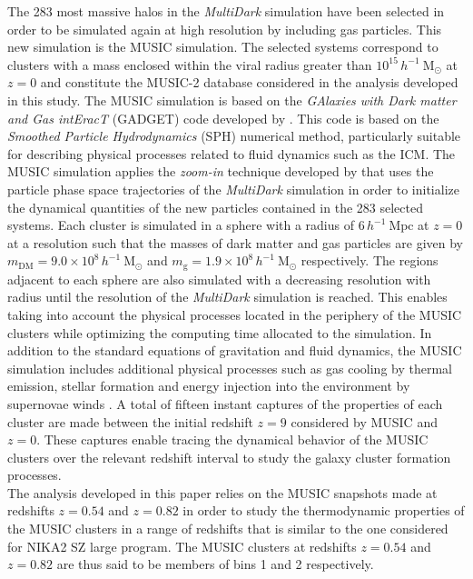 \documentclass[twocolumn,traditabstract]{aa}
\begin{document}
The 283 most massive halos in the \emph{MultiDark} simulation have been selected in order to be simulated again at high resolution by including gas particles. This new simulation is the MUSIC simulation. The selected systems correspond to clusters with a mass enclosed within the viral radius greater than $10^{15}\, h^{-1}~\mathrm{M_{\odot}}$ at $z=0$ and constitute the MUSIC-2 database considered in the analysis developed in this study. The MUSIC simulation is based on the \emph{GAlaxies with Dark matter and Gas intEracT} (GADGET) code developed by \cite{spr01}. This code is based on the \emph{Smoothed Particle Hydrodynamics} (SPH) numerical method, particularly suitable for describing physical processes related to fluid dynamics such as the ICM. The MUSIC simulation applies the \emph{zoom-in} technique developed by \cite{kly01} that uses the particle phase space trajectories of the \emph{MultiDark} simulation in order to initialize the dynamical quantities of the new particles contained in the 283 selected systems. Each cluster is simulated in a sphere with a radius of $6\, h^{-1}~\mathrm{Mpc}$ at $z=0$ at a resolution such that the masses of dark matter and gas particles are given by $m_{\mathrm{DM}} = 9.0\times 10^8\, h^{-1}~\mathrm{M_{\odot}}$ and $m_{\mathrm{g}} = 1.9\times 10^8\, h^{-1}~\mathrm{M_{\odot}}$ respectively. The regions adjacent to each sphere are also simulated with a decreasing resolution with radius until the resolution of the \emph{MultiDark} simulation is reached. This enables taking into account the physical processes located in the periphery of the MUSIC clusters while optimizing the computing time allocated to the simulation. In addition to the standard equations of gravitation and fluid dynamics, the MUSIC simulation includes additional physical processes such as gas cooling by thermal emission, stellar formation and energy injection into the environment by supernovae winds \citep{spr03}. A total of fifteen instant captures of the properties of each cluster are made between the initial redshift $z=9$ considered by MUSIC and $z=0$. These captures enable tracing the dynamical behavior of the MUSIC clusters over the relevant redshift interval to study the galaxy cluster formation processes.\\

The analysis developed in this paper relies on the MUSIC snapshots made at redshifts $z=0.54$ and $z=0.82$ in order to study the thermodynamic properties of the MUSIC clusters in a range of redshifts that is similar to the one considered for NIKA2 SZ large program. The MUSIC clusters at redshifts $z=0.54$ and $z=0.82$ are thus said to be members of bins 1 and 2 respectively.
\end{document}
